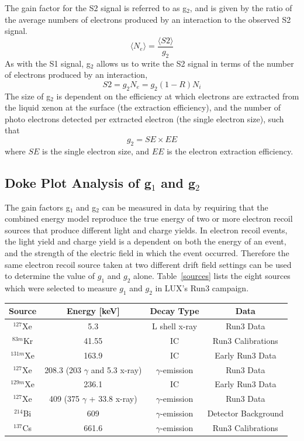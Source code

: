 The gain factor for the S2 signal is referred to as g$_2$, and is given by the ratio of the average numbers of electrons produced by an interaction to the observed S2 signal.  
\begin{equation}
\langle N_e \rangle = \frac{ \langle S2 \rangle }{g_2}
\end{equation}
As with the S1 signal, g$_2$ allows us to write the S2 signal in terms of the number of electrons produced by an interaction,
\begin{equation}
S2=g_2 N_e=g_2 (1-R) N_i
\end{equation}
The size of g$_2$ is dependent on the efficiency at which electrons are extracted from the liquid xenon at the surface (the extraction efficiency), and the number of photo electrons detected per extracted electron (the single electron size), such that
\begin{equation}
g_2 = SE \times EE
\end{equation}
where $SE$ is the single electron size, and $EE$ is the electron extraction efficiency.  

\subsection{Doke Plot Analysis of g$_1$ and g$_2$}

The gain factors g$_1$ and g$_2$ can be measured in data by requiring that the combined energy model reproduce the true energy of two or more electron recoil sources that produce different light and charge yields.  In electron recoil events, the light yield and charge yield is a dependent on both the energy of an event, and the strength of the electric field in which the event occurred.  Therefore the same electron recoil source taken at two different drift field settings can be used to determine the value of $g_1$ and $g_2$ alone. Table~\ref{sources} lists the eight sources which were selected to measure $g_1$ and $g_2$ in LUX's Run3 campaign.  


\begin{center}
\begin{tabular}{ | c| c | c | c | }
\hline
Source & Energy [keV] & Decay Type & Data \\ \hline
$^{127}$Xe & 5.3 & L shell x-ray & Run3 Data \\ \hline
$^{83m}$Kr & 41.55 & IC & Run3 Calibrations \\  \hline
$^{131m}$Xe & 163.9 & IC & Early Run3 Data \\  \hline
$^{127}$Xe & 208.3 (203 $\gamma$ and 5.3 x-ray) & $\gamma$-emission & Run3 Data \\  \hline
$^{129m}$Xe & 236.1 & IC & Early Run3 Data  \\  \hline
$^{127}$Xe & 409 (375 $\gamma$ + 33.8 x-ray) & $\gamma$-emission & Run3 Data \\  \hline
$^{214}$Bi & 609 & $\gamma$-emission & Detector Background \\  \hline
$^{137}$Cs & 661.6 & $\gamma$-emission & Run3 Calibrations \\
\hline
\end{tabular}
\label{sources}
\end{center}

